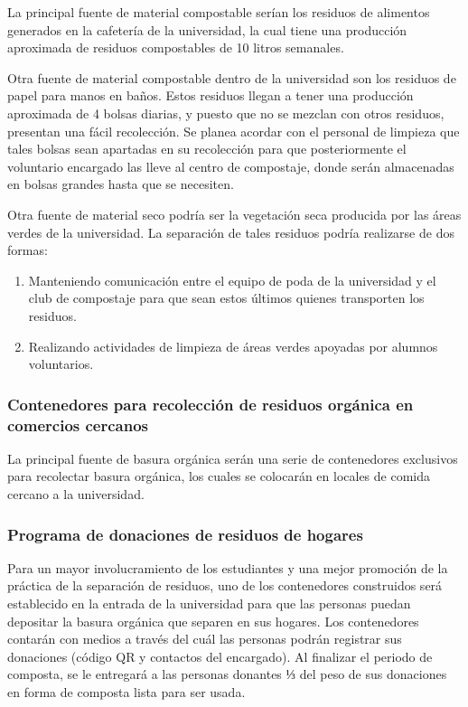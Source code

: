 La principal fuente de material compostable serían los residuos de alimentos generados en la cafetería de la universidad, la cual tiene una producción aproximada de residuos compostables de 10 litros semanales.

Otra fuente de material compostable dentro de la universidad son los residuos de papel para manos en baños. Estos residuos llegan a tener una producción aproximada de 4 bolsas diarias, y puesto que no se mezclan con otros residuos, presentan una fácil recolección. Se planea acordar con el personal de limpieza que tales bolsas sean apartadas en su recolección para que posteriormente el voluntario encargado las lleve al centro de compostaje, donde serán almacenadas en bolsas grandes hasta que se necesiten.

Otra fuente de material seco podría ser la vegetación seca producida por las áreas verdes de la universidad. La separación de tales residuos podría realizarse de dos formas:

\begin{enumerate}
    \item Manteniendo comunicación entre el equipo de poda de la universidad y el club de compostaje para que sean estos últimos quienes transporten los residuos.
    \item Realizando actividades de limpieza de áreas verdes apoyadas por alumnos voluntarios.
\end{enumerate}


\subsubsection{Contenedores para recolección de residuos orgánica en comercios cercanos}

La principal fuente de basura orgánica serán una serie de contenedores exclusivos para recolectar basura orgánica, los cuales se colocarán en locales de comida cercano a la universidad.

    
    
\subsubsection{Programa de donaciones de residuos de hogares}

Para un mayor involucramiento de los estudiantes y una mejor promoción de la práctica de la separación de residuos, uno de los contenedores construidos será establecido en la entrada de la universidad para que las personas puedan depositar la basura orgánica que separen en sus hogares. Los contenedores contarán con medios a través del cuál las personas podrán registrar sus donaciones (código QR y contactos del encargado). Al finalizar el periodo de composta, se le entregará a las personas donantes ⅓ del peso de sus donaciones en forma de composta lista para ser usada.

